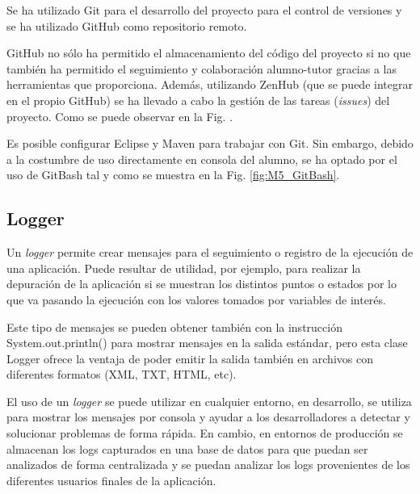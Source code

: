 Se ha utilizado Git para el desarrollo del proyecto para el control de versiones y se ha utilizado GitHub como repositorio remoto. 

GitHub no sólo ha permitido el almacenamiento del código del proyecto si no que también ha permitido el seguimiento y colaboración alumno-tutor gracias a las herramientas que proporciona. Además, utilizando ZenHub (que se puede integrar en el propio GitHub) se ha llevado a cabo la gestión de las tareas (\textit{issues}) del proyecto. Como se puede observar en la Fig. \cite{fig:M5_GitHub-ZenHub_board}.


Es posible configurar Eclipse y Maven para trabajar con Git. Sin embargo, debido a la costumbre de uso directamente en consola del alumno, se ha optado por el uso de GitBash tal y como se muestra en la Fig. \ref{fig:M5_GitBash}.


\subsection{Logger}


Un \textit{logger} permite crear mensajes para el seguimiento o registro de la ejecución de una aplicación. Puede resultar de utilidad, por ejemplo, para realizar la depuración de la aplicación si se muestran los distintos puntos o estados por lo que va pasando la ejecución con los valores tomados por variables de interés\cite{logger_info}.

Este tipo de mensajes se pueden obtener también con la instrucción System.out.println() para mostrar mensajes en la salida estándar, pero esta clase Logger ofrece la ventaja de poder emitir la salida también en archivos con diferentes formatos (XML, TXT, HTML, etc).

El uso de un \textit{logger} se puede utilizar en cualquier entorno, en desarrollo, se utiliza para mostrar los mensajes por consola y ayudar a los desarrolladores a detectar y solucionar problemas de forma rápida. En cambio, en entornos de producción se almacenan los logs capturados en una base de datos para que puedan ser analizados de forma centralizada y se puedan analizar los logs provenientes de los diferentes usuarios finales de la aplicación.


